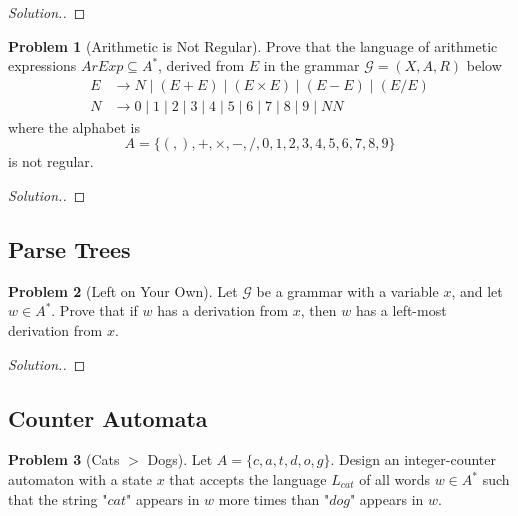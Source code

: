 \documentclass[11pt]{article}
\theoremstyle{theorem} %
\theoremstyle{definition} %
\newtheorem{problem}                    {{\color{BurntOrange}Problem}}
\theoremstyle{remark} %
\begin{document}
\begin{proof}
    [Solution.]
\end{proof}

\begin{problem}
    [Arithmetic is Not Regular]
    Prove that the language of arithmetic expressions \(\mathit{ArExp} \subseteq A^*\), derived from \(E\) in the grammar \(\mathcal G = (X, A, R)\) below
    \[\begin{aligned}
        E &\to 
            N
            \mid (E + E)
            \mid (E \times E)
            \mid (E - E)
            \mid (E / E) \\
        N &\to 0 \mid 1 \mid 2 \mid 3 \mid 4 \mid 5 \mid 6 \mid 7 \mid 8 \mid 9 \mid NN
    \end{aligned}\]
    where the alphabet is
    \[
        A = \big\{ (, ), +, \times, -, /, 0,1,2,3,4,5,6,7,8,9 \big\}
    \]
    is not regular. 
\end{problem}

\begin{proof}
    [Solution.]
\end{proof}

\subsection*{Parse Trees}

\begin{problem}
    [Left on Your Own]
    Let \(\mathcal G\) be a grammar with a variable \(x\), and let \(w \in A^*\).
    Prove that if \(w\) has a derivation from \(x\), then \(w\) has a left-most derivation from \(x\).
\end{problem}

\begin{proof}
    [Solution.]
\end{proof}

\subsection*{Counter Automata}

\begin{problem}
    [Cats \(>\) Dogs]
    Let \(A = \{c, a, t, d, o, g\}\). 
    Design an integer-counter automaton with a state \(x\) that accepts the language \(L_{cat}\) of all words \(w \in A^*\) such that the string "\(cat\)" appears in \(w\) more times than "\(dog\)" appears in \(w\).
\end{problem}
\end{document}
